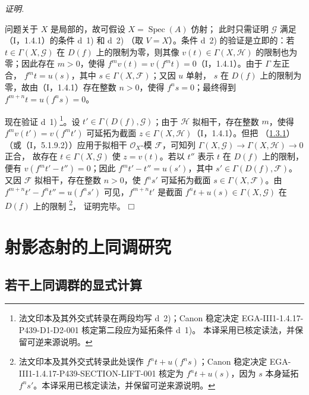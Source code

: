 \documentclass[UTF8,fontset=none,11pt,oneside,openany]{ctexbook}
\providecommand{\square}{\mdlgwhtsquare}
\newcommand{\SourceCorrectionNote}[1]{\footnote{#1}}
\newenvironment{proof}{%
  \par\smallskip\noindent\textit{证明.}\ %
}{\hfill$\square$\par}
\newcommand{\oldpage}[2][]{%
  \hypertarget{ega-source-page-#1-#2}{}%
  \marginnote{\scriptsize\textbf{#1}~|~#2}\ignorespaces}
\let\EGAOriginalLabel\label
\renewcommand{\label}[1]{\phantomsection\EGAOriginalLabel{#1}}
\begin{document}
\oldpage[III]{95}
\begin{proof}
问题关于 $X$ 是局部的，故可假设 $X=\operatorname{Spec}(A)$ 仿射；
此时只需证明 $\mathcal G$ 满足（I，1.4.1）的条件 d~1) 和 d~2)
（取 $V=X$）。条件 d~2) 的验证是立即的：若
$t\in\Gamma(X,\mathcal G)$ 在 $D(f)$ 上的限制为零，则其像
$v(t)\in\Gamma(X,\mathcal H)$ 的限制也为零；因此存在 $m>0$，使得
$f^mv(t)=v(f^mt)=0$（I，1.4.1）。由于 $\Gamma$ 左正合，
$f^mt=u(s)$，其中 $s\in\Gamma(X,\mathcal F)$；又因 $u$ 单射，
$s$ 在 $D(f)$ 上的限制为零，故由（I，1.4.1）存在整数 $n>0$，使得
$f^ns=0$；最终得到 $f^{m+n}t=u(f^ns)=0$。

现在验证 d~1)
\SourceCorrectionNote{法文印本及其外交式转录在两段均写 d~2)；Canon 稳定决定
EGA-III1-1.4.17-P439-D1-D2-001 核定第二段应为延拓条件 d~1)。
本译采用已核定读法，并保留可逆来源说明。}。设
$t'\in\Gamma(D(f),\mathcal G)$；由于 $\mathcal H$
拟相干，存在整数 $m$，使得 $f^mv(t')=v(f^mt')$ 可延拓为截面
$z\in\Gamma(X,\mathcal H)$（I，1.4.1）。但把
（\hyperref[III.1.3.1-fr]{1.3.1}）（或（I，5.1.9.2））应用于拟相干
$\mathcal O_X$-模 $\mathcal F$，可知列
$\Gamma(X,\mathcal G)\to\Gamma(X,\mathcal H)\to0$ 正合，
故存在 $t\in\Gamma(X,\mathcal G)$ 使 $z=v(t)$。若以 $t''$ 表示 $t$
在 $D(f)$ 上的限制，便有 $v(f^mt'-t'')=0$；因此
$f^mt'-t''=u(s')$，其中 $s'\in\Gamma(D(f),\mathcal F)$。
又因 $\mathcal F$ 拟相干，存在整数 $n>0$，使 $f^ns'$ 可延拓为截面
$s\in\Gamma(X,\mathcal F)$。由
$f^{m+n}t'-f^nt''=u(f^ns')$ 可见，$f^{m+n}t'$ 是截面
$f^nt+u(s)\in\Gamma(X,\mathcal G)$ 在 $D(f)$ 上的限制
\SourceCorrectionNote{法文印本及其外交式转录此处误作 $f^nt+u(f^ns)$；Canon 稳定决定
EGA-III1-1.4.17-P439-SECTION-LIFT-001 核定为 $f^nt+u(s)$，因为 $s$
本身延拓 $f^ns'$。本译采用已核定读法，并保留可逆来源说明。}，
证明完毕。
\end{proof}

\section{射影态射的上同调研究}
\label{section:III.2-fr}

\subsection{若干上同调群的显式计算}
\label{subsection:III.2.1-fr}
\end{document}
